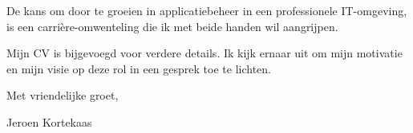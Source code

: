 \documentclass[10pt,a4paper]{article}
\begin{document}
\begin{adjustwidth}{15mm}{15mm}
De kans om door te groeien in applicatiebeheer in een professionele IT-omgeving, is een carrière-omwenteling die ik met beide handen wil aangrijpen.

Mijn CV is bijgevoegd voor verdere details. Ik kijk ernaar uit om mijn motivatie en mijn visie op deze rol in een gesprek toe te lichten.

\vspace{2em}

Met vriendelijke groet,

\vspace{3em}

Jeroen Kortekaas

\end{adjustwidth}
\end{document}
